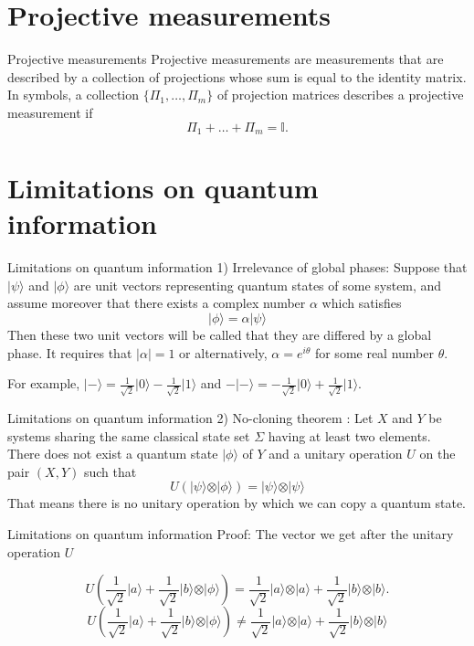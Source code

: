 \documentclass[12pt, aspectratio=169]{beamer}
\begin{document}
\section{Projective measurements}
\begin{frame}{Projective measurements}
Projective measurements are measurements that are described by a collection of projections whose sum is equal to the identity matrix. In symbols, a collection $\{\Pi_1, \ldots, \Pi_m\}$ of projection matrices describes a projective measurement if
\[
\Pi_1 + \ldots + \Pi_m = \mathbb{I}.
\]
\end{frame}
\section{Limitations on quantum information}
\begin{frame}{Limitations on quantum information}
1) Irrelevance of global phases:
Suppose that $\vert \psi \rangle$ and $\vert \phi \rangle$ are unit vectors representing quantum states of some system, and assume moreover that there exists a complex number $\alpha$ which satisfies
\[
\vert \phi \rangle = \alpha \vert \psi \rangle
\]
Then these two unit vectors will be called that they are differed by a global phase. It requires that $\vert \alpha \vert = 1$ or alternatively, $\alpha = e^{i\theta}$ for some real number $\theta$.

For example, $\vert - \rangle = \frac{1}{\sqrt{2}} \vert 0 \rangle - \frac{1}{\sqrt{2}} \vert 1 \rangle$ and $- \vert - \rangle = -\frac{1}{\sqrt{2}} \vert 0 \rangle + \frac{1}{\sqrt{2}} \vert 1 \rangle$.

\end{frame}
\begin{frame}{Limitations on quantum information}
2) No-cloning theorem :
Let \(X\) and \(Y\) be systems sharing the same classical state set \(\Sigma\) having at least two elements. There does not exist a quantum state \(\vert \phi \rangle\) of \(Y\) and a unitary operation \(U\) on the pair \((X,Y)\) such that
\[
U(\vert \psi \rangle \otimes \vert \phi \rangle) = \vert \psi \rangle \otimes \vert \psi \rangle
\]
That means there is no unitary operation by which we can copy a quantum state.
\end{frame}
\begin{frame}{Limitations on quantum information}
Proof:
The vector we get after the unitary operation \(U\)



\[
U\left(\frac{1}{\sqrt{2}} \vert a \rangle + \frac{1}{\sqrt{2}} \vert b \rangle \otimes \vert \phi \rangle\right) = \frac{1}{\sqrt{2}} \vert a \rangle \otimes \vert a \rangle + \frac{1}{\sqrt{2}} \vert b \rangle \otimes \vert b \rangle.
\]
\[
U\left(\frac{1}{\sqrt{2}} \vert a \rangle + \frac{1}{\sqrt{2}} \vert b \rangle \otimes \vert \phi \rangle\right) \neq \frac{1}{\sqrt{2}} \vert a \rangle \otimes \vert a \rangle + \frac{1}{\sqrt{2}} \vert b \rangle \otimes \vert b \rangle
\]
\end{frame}
\end{document}
